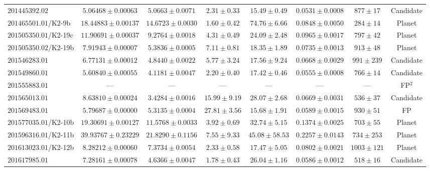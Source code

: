 \begin{landscape}
\begin{table}[hbt!]
\begin{center}
\begin{tabular}{lccccccc}
$201445392.02$ & $5.06468 \pm {0.00063}$ & $5.0663 \pm {0.0071}$ & $2.31 \pm {0.33}$ & $15.49 \pm {0.49}$ & $0.0531 \pm {0.0008}$ & $877 \pm {17} $      & Candidate \\
$201465501.01$/K2-9b & $18.44883 \pm {0.00137}$ & $14.6723 \pm {0.0030}$ & $1.60 \pm {0.42}$ & $74.76 \pm {6.66}$ & $0.0848 \pm {0.0050}$ & $284 \pm {14} $    & Planet \\
$201505350.01$/K2-19c & $11.90691 \pm {0.00037}$ & $9.2764 \pm {0.0018}$ & $4.31 \pm {0.49}$ & $24.09 \pm {2.48}$ & $0.0965 \pm {0.0017}$ & $797 \pm {42} $     & Planet \\
$201505350.02$/K2-19b & $7.91943 \pm {0.00007}$ & $5.3836 \pm {0.0005}$ & $7.11 \pm {0.81}$ & $18.35 \pm {1.89}$ & $0.0735 \pm {0.0013}$ & $913 \pm {48} $      & Planet \\
$201546283.01$ & $6.77131 \pm {0.00012}$ & $4.8440 \pm {0.0022}$ & $5.77 \pm {3.24}$ & $17.56 \pm {9.24}$ & $0.0668 \pm {0.0029}$ & $991 \pm {239} $     & Candidate \\
$201549860.01$ & $5.60840 \pm {0.00055}$ & $4.1181 \pm {0.0047}$ & $2.20 \pm {0.40}$ & $17.42 \pm {0.46}$ & $0.0555 \pm {0.0008}$ & $766 \pm {14} $      & Candidate \\
$201555883.01$ & --- & --- & --- & --- & --- & --- & FP$^{2}$\\
$201565013.01$ & $8.63810 \pm {0.00024}$ & $3.4284 \pm {0.0016}$ & $15.99 \pm {9.19}$ & $28.07 \pm {2.68}$ & $0.0669 \pm {0.0031}$ & $536 \pm {37} $     & Candidate \\
$201569483.01$ & $5.79687 \pm {0.00000}$ & $5.3135 \pm {0.0004}$ & $27.81 \pm {3.56}$ & $15.68 \pm {1.91}$ & $0.0589 \pm {0.0015}$ & $930 \pm {51} $     & FP \\
$201577035.01$/K2-10b & $19.30691 \pm {0.00127}$ & $11.5768 \pm {0.0033}$ & $3.92 \pm {0.69}$ & $32.74 \pm {5.15}$ & $0.1374 \pm {0.0025}$ & $703 \pm {55} $    & Planet \\
$201596316.01$/K2-11b & $39.93767 \pm {0.23229}$ & $21.8290 \pm {0.1156}$ & $7.55 \pm {9.33}$ & $45.08 \pm {58.53}$ & $0.2257 \pm {0.0143}$ & $734 \pm {253} $  & Planet \\
$201613023.01$/K2-12b & $8.28212 \pm {0.00060}$ & $7.3734 \pm {0.0054}$ & $2.33 \pm {0.58}$ & $17.47 \pm {5.05}$ & $0.0802 \pm {0.0021}$ & $1003 \pm {121} $    & Planet \\
$201617985.01$ & $7.28161 \pm {0.00078}$ & $4.6366 \pm {0.0047}$ & $1.78 \pm {0.43}$ & $26.04 \pm {1.16}$ & $0.0586 \pm {0.0012}$ & $518 \pm {16} $      & Candidate \\

\end{tabular}
\end{center}
\end{table}
\end{landscape}
